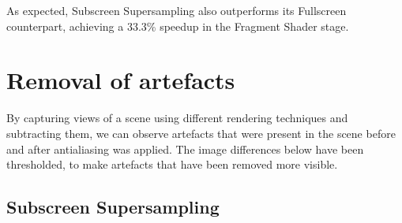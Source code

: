 \documentclass[12pt,a4paper,twoside,openright]{report}
\begin{document}
As expected, Subscreen Supersampling also outperforms its Fullscreen counterpart, achieving a 33.3\% speedup in the Fragment Shader stage. 

\clearpage
\section{Removal of artefacts}\label{removeArtefacts}
By capturing views of a scene using different rendering techniques and subtracting them, we can observe artefacts that were present in the scene before and after antialiasing was applied. The image differences below have been thresholded, to make artefacts that have been removed more visible. 

\subsection{Subscreen Supersampling}
\end{document}

